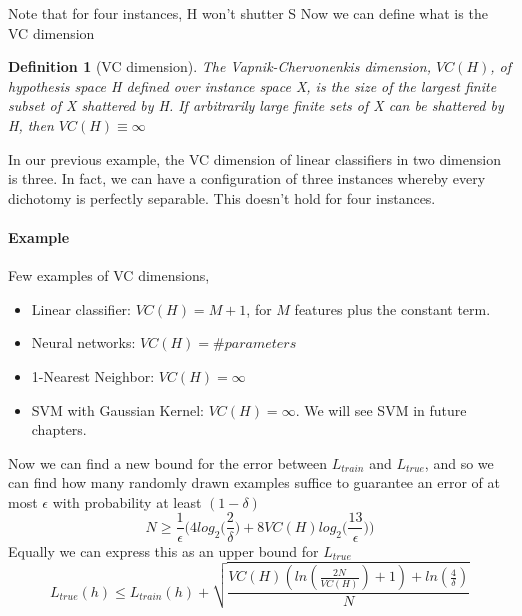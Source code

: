 \documentclass[main.tex]{subfiles}
\newtheorem{definition}{Definition}[section]
\begin{document}
Note that for four instances, H won't shutter S\footnotemark {}
Now we can define what is the VC dimension
\begin{definition}[VC dimension]
The Vapnik-Chervonenkis dimension, $VC(H)$, of hypothesis space H
defined over instance space X, is the size of the largest finite subset of X shattered by H. If arbitrarily large finite sets of X can be shattered by H, then $VC(H) \equiv \infty$
\end{definition}
In our previous example, the VC dimension of linear classifiers in two dimension is three. In fact, we can have a configuration of three instances whereby every dichotomy is perfectly separable. This doesn't hold for four instances.
\paragraph{Example} Few examples of VC dimensions,
\begin{itemize}
    \item Linear classifier: $VC(H) = M+1$, for $M$ features plus the constant term.
    \item Neural networks: $VC(H) = \#parameters$
    \item 1-Nearest Neighbor: $VC(H) = \infty$
    \item SVM with Gaussian Kernel: $VC(H) = \infty$. We will see SVM in future chapters.
\end{itemize}
Now we can find a new bound for the error between $L_{train}$ and $L_{true}$, and so we can find how many randomly drawn examples suffice to guarantee an error of at most $\epsilon$ with probability at least $(1-\delta)$
\begin{equation}
    N \geq \frac{1}{\epsilon} \bigg( 4log_2 \bigg( \frac{2}{\delta} \bigg) + 8VC(H) log_2 \bigg( \frac{13}{\epsilon} \bigg) \bigg)
\end{equation}
Equally we can express this as an upper bound for $L_{true}$
\begin{equation}
    L_{true}(h) \leq L_{train}(h) + \sqrt{\frac{VC(H)(ln(\frac{2N}{VC(H)})+1)+ln(\frac{4}{\delta})}{N}}
\end{equation}
\end{document}
